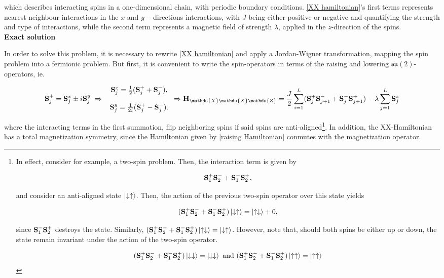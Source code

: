 \documentclass{homework}
\begin{document}
which describes interacting spins in a one-dimensional chain, with periodic boundary conditions. \eqref{XX hamiltonian}'s first terms represents nearest neighbour interactions in the $x$ and $y-$directions  interactions, with $J$ being either positive or negative and quantifying the strength and type of interactions, while the second term represents a magnetic field of strength $\lambda$, applied in the $z$-direction of the spins. \\

{\textbf{Exact solution}}

In order to solve this problem, it is necessary to rewrite \eqref{XX hamiltonian} and apply a Jordan-Wigner transformation, mapping the spin problem into a fermionic problem. But first, it is convenient to write the spin-operators in terms of the raising and lowering $\mathfrak{su}(2)$-operators, ie.

$$
    \spin_j^{\pm} = \spin_j^{x} \pm i \spin_j^{y} \blanky \Rightarrow \blanky \begin{array}{c}
         \spin_{j}^x = \frac{1}{2} (\spin_j^+ + \spin_j^-), \\
          \\
         \spin_{j}^y = \frac{1}{2i} (\spin_j^+ - \spin_j^-). 
    \end{array} \Rightarrow {\bf H}_{\mathds{X}\mathds{X}\mathds{Z}} = \frac{J}{2} \sum_{i=1}^{L} ({\bf S}_{j}^{+} {\bf S}_{j+1}^{-} + {\bf S}_{j}^{-} {\bf S}_{j+1}^{+}) - \lambda \sum_{j=1}^{L} {\bf S}_{j}^{z}
     \label{raising Hamiltonian}
$$

where the interacting terms in the first summation, flip neighboring spins if said spins are anti-aligned\footnote{In effect, consider for example, a two-spin problem. Then, the interaction term is given by 

$$
{\bf S}_1^+ {\bf S}_2^- + {\bf S}_1^- {\bf S}_2^+,
$$

and consider an anti-aligned state $\ket{\downarrow\uparrow}$. Then, the action of the previous two-spin operator over this state yields

$$
({\bf S}_1^+ {\bf S}_2^- + {\bf S}_1^- {\bf S}_2^+) \ket{\downarrow\uparrow} = \ket{\uparrow\downarrow} + 0,
$$

since ${\bf S}_1^- {\bf S}_2^+$ destroys the state. Similarly, $({\bf S}_1^+ {\bf S}_2^- + {\bf S}_1^- {\bf S}_2^+)\ket{\uparrow\downarrow} = \ket{\downarrow\uparrow}$. However, note that, should both spins be either up or down, the state remain invariant under the action of the two-spin operator. 

\begin{align}
    ({\bf S}_1^+ {\bf S}_2^- + {\bf S}_1^- {\bf S}_2^+) \ket{\downarrow\downarrow} = \ket{\downarrow\downarrow} \textnormal{ and } ({\bf S}_1^+ {\bf S}_2^- + {\bf S}_1^- {\bf S}_2^+) \ket{\uparrow\uparrow} = \ket{\uparrow\uparrow} 
\end{align}}. In addition, the XX-Hamiltonian has a total magnetization symmetry, since the Hamiltonian given by \eqref{raising Hamiltonian} conmutes with the magnetization operator. \\
\end{document}
